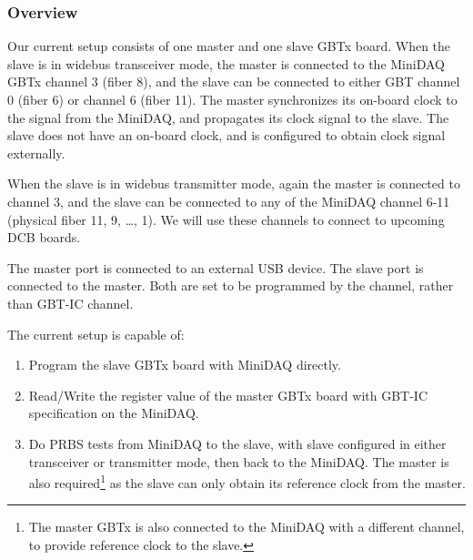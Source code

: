 \subsubsection{Overview}
Our current setup consists of one master and one slave GBTx board.
When the slave is in widebus transceiver mode,
the master is connected to the MiniDAQ GBTx channel 3 (fiber 8),
and the slave can be connected to either GBT channel 0 (fiber 6) or channel 6
(fiber 11).
The master synchronizes its on-board clock to the signal from the MiniDAQ,
and propagates its clock signal to the slave.
The slave does not have an on-board clock,
and is configured to obtain clock signal externally.

When the slave is in widebus transmitter mode,
again the master is connected to channel 3,
and the slave can be connected to any of the MiniDAQ channel 6-11
(physical fiber 11, 9, \ldots, 1).
We will use these channels to connect to upcoming DCB boards.

The master \itwoc port is connected to an external USB device.
The slave \itwoc port is connected to the master.
Both are set to be programmed by the \itwoc channel,
rather than GBT-IC channel.

The current setup is capable of:
\begin{enumerate}
    \item Program the slave GBTx board with MiniDAQ directly.
    \item Read/Write the register value of the master GBTx board with GBT-IC
        specification on the MiniDAQ.
    \item Do PRBS tests from MiniDAQ to the slave, with slave configured in
        either transceiver or transmitter mode, then back to the MiniDAQ.
        The master is also required\footnote{
            The master GBTx is also connected to the MiniDAQ with a different
        channel, to provide reference clock to the slave.}
        as the slave can only obtain its reference clock from the master.
\end{enumerate}
